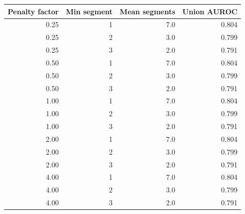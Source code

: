 \begin{tabular}{rrrr}
\toprule
Penalty factor & Min segment & Mean segments & Union AUROC \\
\midrule
0.25 & 1 & 7.0 & 0.804 \\
0.25 & 2 & 3.0 & 0.799 \\
0.25 & 3 & 2.0 & 0.791 \\
0.50 & 1 & 7.0 & 0.804 \\
0.50 & 2 & 3.0 & 0.799 \\
0.50 & 3 & 2.0 & 0.791 \\
1.00 & 1 & 7.0 & 0.804 \\
1.00 & 2 & 3.0 & 0.799 \\
1.00 & 3 & 2.0 & 0.791 \\
2.00 & 1 & 7.0 & 0.804 \\
2.00 & 2 & 3.0 & 0.799 \\
2.00 & 3 & 2.0 & 0.791 \\
4.00 & 1 & 7.0 & 0.804 \\
4.00 & 2 & 3.0 & 0.799 \\
4.00 & 3 & 2.0 & 0.791 \\
\bottomrule
\end{tabular}

